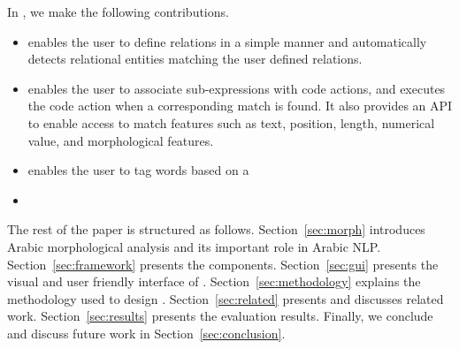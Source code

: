 In \framework, we make the following contributions.
\begin{itemize}
  \item \framework enables the user to define relations in a simple manner
    and automatically detects relational entities matching the user defined relations. 
  \item \framework enables the user to associate sub-expressions
    with code actions, and executes the code action 
    when a corresponding match is found.
    It also provides an API to enable access to match 
    features such as text, position, length, numerical value, and morphological features.
  \item \framework enables the user to tag words based on a 

  \item {}
\end{itemize}

The rest of the paper is structured as follows.
Section~\ref{sec:morph} introduces Arabic morphological analysis 
and its important role in Arabic NLP.
Section~\ref{sec:framework} presents the \framework components.
Section~\ref{sec:gui} presents the visual and user friendly interface of \framework. 
Section~\ref{sec:methodology} explains the methodology used to design \framework.
Section~\ref{sec:related} presents and discusses related work.
Section~\ref{sec:results} presents the evaluation results. 
Finally, we conclude and discuss future work in Section~\ref{sec:conclusion}.
